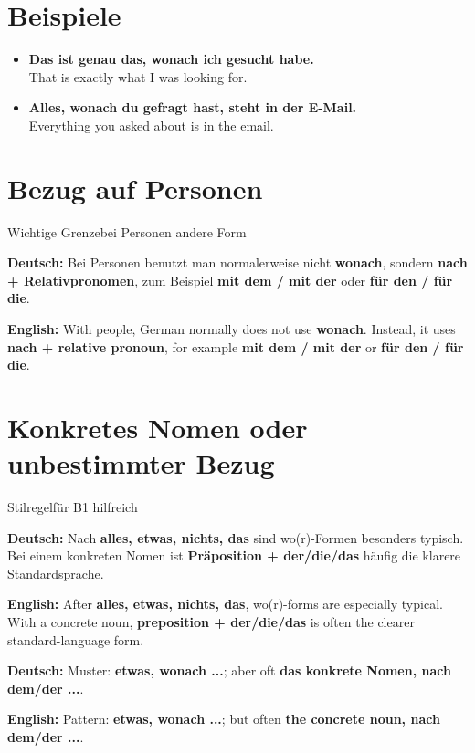 \documentclass[a4paper,11pt]{article}
\newcommand{\GermanText}[1]{\textbf{Deutsch: }#1\par}
\newcommand{\EnglishText}[1]{{\small\color{SoftGray}\textbf{English: }#1\par}}
\newcommand{\ExampleItem}[2]{\item \textbf{#1}\\{\small\color{SoftGray}#2}}
\begin{document}
\section{Beispiele}

\begin{exbox}

\begin{itemize}

\ExampleItem{Das ist genau das, wonach ich gesucht habe.}{That is exactly what I was looking for.}

\ExampleItem{Alles, wonach du gefragt hast, steht in der E-Mail.}{Everything you asked about is in the email.}

\end{itemize}

\end{exbox}

\section{Bezug auf Personen}

\begin{grammarentry}{Wichtige Grenze}{bei Personen andere Form}

\GermanText{Bei Personen benutzt man normalerweise nicht \textbf{wonach}, sondern \textbf{nach + Relativpronomen}, zum Beispiel \textbf{mit dem / mit der} oder \textbf{für den / für die}.}

\EnglishText{With people, German normally does not use \textbf{wonach}. Instead, it uses \textbf{nach + relative pronoun}, for example \textbf{mit dem / mit der} or \textbf{für den / für die}.}

\end{grammarentry}

\section{Konkretes Nomen oder unbestimmter Bezug}

\begin{grammarentry}{Stilregel}{für B1 hilfreich}

\GermanText{Nach \textbf{alles, etwas, nichts, das} sind wo(r)-Formen besonders typisch. Bei einem konkreten Nomen ist \textbf{Präposition + der/die/das} häufig die klarere Standardsprache.}

\EnglishText{After \textbf{alles, etwas, nichts, das}, wo(r)-forms are especially typical. With a concrete noun, \textbf{preposition + der/die/das} is often the clearer standard-language form.}

\GermanText{Muster: \textbf{etwas, wonach ...}; aber oft \textbf{das konkrete Nomen, nach dem/der ...}.}

\EnglishText{Pattern: \textbf{etwas, wonach ...}; but often \textbf{the concrete noun, nach dem/der ...}.}

\end{grammarentry}
\end{document}
